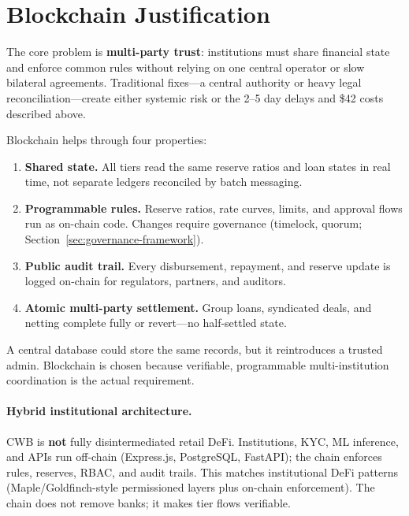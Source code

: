 \documentclass[12pt,a4paper]{report}
\begin{document}
\section{Blockchain Justification}
\label{sec:blockchain-justification}

The core problem is \textbf{multi-party trust}: institutions must share financial state and enforce common rules without relying on one central operator or slow bilateral agreements. Traditional fixes---a central authority or heavy legal reconciliation---create either systemic risk or the 2--5 day delays and \$42 costs described above.

Blockchain helps through four properties:

\begin{enumerate}[noitemsep]
\item \textbf{Shared state.} All tiers read the same reserve ratios and loan states in real time, not separate ledgers reconciled by batch messaging.

\item \textbf{Programmable rules.} Reserve ratios, rate curves, limits, and approval flows run as on-chain code. Changes require governance (timelock, quorum; Section~\ref{sec:governance-framework}).

\item \textbf{Public audit trail.} Every disbursement, repayment, and reserve update is logged on-chain for regulators, partners, and auditors.

\item \textbf{Atomic multi-party settlement.} Group loans, syndicated deals, and netting complete fully or revert---no half-settled state.
\end{enumerate}

A central database could store the same records, but it reintroduces a trusted admin. Blockchain is chosen because verifiable, programmable multi-institution coordination is the actual requirement.

\paragraph{Hybrid institutional architecture.}
CWB is \textbf{not} fully disintermediated retail DeFi. Institutions, KYC, ML inference, and APIs run off-chain (Express.js, PostgreSQL, FastAPI); the chain enforces rules, reserves, RBAC, and audit trails. This matches institutional DeFi patterns (Maple/Goldfinch-style permissioned layers plus on-chain enforcement). The chain does not remove banks; it makes tier flows verifiable.
\end{document}

